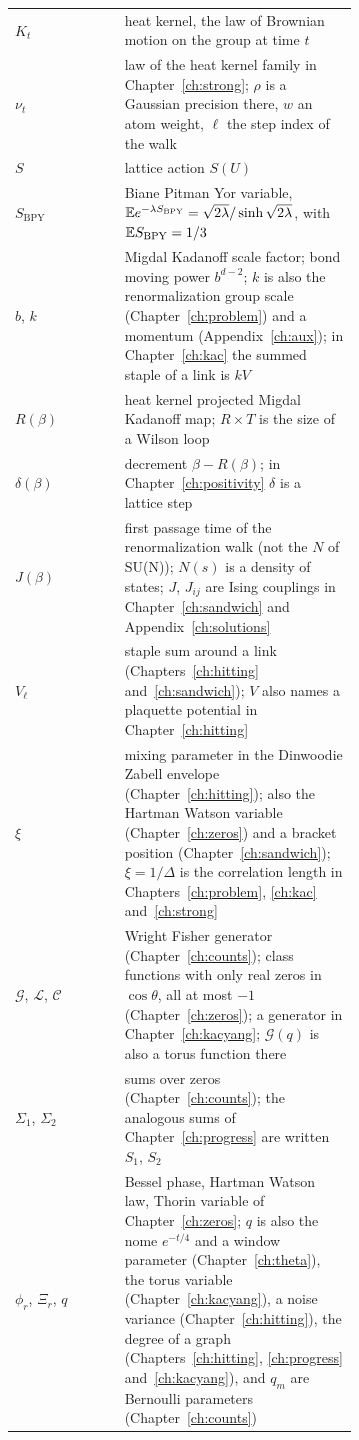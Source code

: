 \begin{longtable}{lp{0.68\linewidth}}
$K_t$ & heat kernel, the law of Brownian motion on the group at time $t$ \\
$\nu_t$ & law of the heat kernel family in Chapter~\ref{ch:strong}; $\rho$ is a Gaussian precision there, $w$ an atom weight, $\ell$ the step index of the walk \\
$S$ & lattice action $S(U)$ \\
$S_{\mathrm{BPY}}$ & Biane Pitman Yor variable, $\mathbb{E} e^{-\lambda S_{\mathrm{BPY}}}=\sqrt{2\lambda}/\sinh\sqrt{2\lambda}$, with $\mathbb{E} S_{\mathrm{BPY}}=1/3$ \\
$b$, $k$ & Migdal Kadanoff scale factor; bond moving power $b^{d-2}$; $k$ is also the renormalization group scale (Chapter~\ref{ch:problem}) and a momentum (Appendix~\ref{ch:aux}); in Chapter~\ref{ch:kac} the summed staple of a link is $kV$ \\
$R(\beta)$ & heat kernel projected Migdal Kadanoff map; $R\times T$ is the size of a Wilson loop \\
$\delta(\beta)$ & decrement $\beta-R(\beta)$; in Chapter~\ref{ch:positivity} $\delta$ is a lattice step \\
$J(\beta)$ & first passage time of the renormalization walk (not the $N$ of SU(N)); $N(s)$ is a density of states; $J$, $J_{ij}$ are Ising couplings in Chapter~\ref{ch:sandwich} and Appendix~\ref{ch:solutions} \\
$V_\ell$ & staple sum around a link (Chapters~\ref{ch:hitting} and~\ref{ch:sandwich}); $V$ also names a plaquette potential in Chapter~\ref{ch:hitting} \\
$\xi$ & mixing parameter in the Dinwoodie Zabell envelope (Chapter~\ref{ch:hitting}); also the Hartman Watson variable (Chapter~\ref{ch:zeros}) and a bracket position (Chapter~\ref{ch:sandwich}); $\xi=1/\Delta$ is the correlation length in Chapters~\ref{ch:problem}, \ref{ch:kac} and~\ref{ch:strong} \\
$\mathcal G$, $\mathcal L$, $\mathcal C$ & Wright Fisher generator (Chapter~\ref{ch:counts}); class functions with only real zeros in $\cos\theta$, all at most $-1$ (Chapter~\ref{ch:zeros}); a generator in Chapter~\ref{ch:kacyang}; $\mathcal G(q)$ is also a torus function there \\
$\Sigma_1$, $\Sigma_2$ & sums over zeros (Chapter~\ref{ch:counts}); the analogous sums of Chapter~\ref{ch:progress} are written $S_1$, $S_2$ \\
$\phi_r$, $\Xi_r$, $q$ & Bessel phase, Hartman Watson law, Thorin variable of Chapter~\ref{ch:zeros}; $q$ is also the nome $e^{-t/4}$ and a window parameter (Chapter~\ref{ch:theta}), the torus variable (Chapter~\ref{ch:kacyang}), a noise variance (Chapter~\ref{ch:hitting}), the degree of a graph (Chapters~\ref{ch:hitting}, \ref{ch:progress} and~\ref{ch:kacyang}), and $q_m$ are Bernoulli parameters (Chapter~\ref{ch:counts}) \\

\end{longtable}
